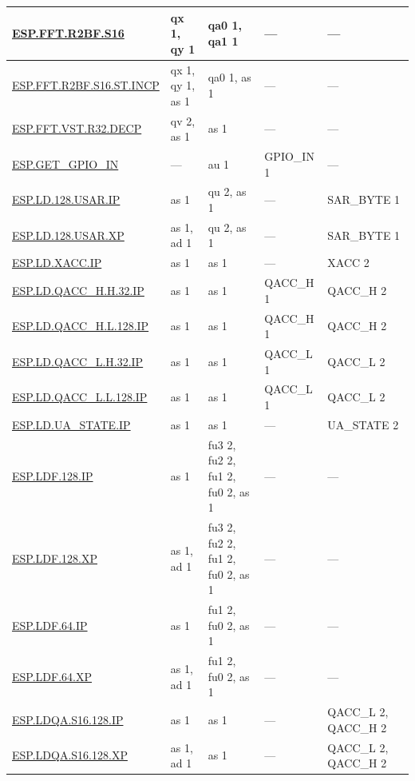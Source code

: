 \begin{longtable}[c]{|l|m{2.5cm}|m{2.5cm}|m{2.5cm}|m{2.5cm}|}
    \hyperref[instruction:ESPFFTR2BFS16]{ESP.FFT.R2BF.S16} & qx 1, qy 1 & qa0 1, qa1 1 & — & — \\\hline
    \hyperref[instruction:ESPFFTR2BFS16STINCP]{ESP.FFT.R2BF.S16.ST.INCP} & qx 1, qy 1, as 1 & qa0 1, as 1 & — & — \\\hline
    \hyperref[instruction:ESPFFTVSTR32DECP]{ESP.FFT.VST.R32.DECP} & qv 2, as 1 & as 1 & — & — \\\hline
    \hyperref[instruction:ESPGETGPIOIN]{ESP.GET\_GPIO\_IN} & — & au 1 & GPIO\_IN 1 & — \\\hline
    \hyperref[instruction:ESPLD128USARIP]{ESP.LD.128.USAR.IP} & as 1 & qu 2, as 1 & — & SAR\_BYTE 1\\\hline
    \hyperref[instruction:ESPLD128USARXP]{ESP.LD.128.USAR.XP} & as 1, ad 1 & qu 2, as 1 & — & SAR\_BYTE 1\\\hline
    \hyperref[instruction:ESPLDXACCIP]{ESP.LD.XACC.IP} & as 1 & as 1 & — & XACC 2\\\hline
    \hyperref[instruction:ESPLDQACCHH32IP]{ESP.LD.QACC\_H.H.32.IP} & as 1 & as 1 & QACC\_H 1 & QACC\_H 2\\\hline
    \hyperref[instruction:ESPLDQACCHL128IP]{ESP.LD.QACC\_H.L.128.IP} & as 1 & as 1 & QACC\_H 1 & QACC\_H 2\\\hline
    \hyperref[instruction:ESPLDQACCLH32IP]{ESP.LD.QACC\_L.H.32.IP} & as 1 & as 1 & QACC\_L 1 & QACC\_L 2\\\hline
    \hyperref[instruction:ESPLDQACCLL128IP]{ESP.LD.QACC\_L.L.128.IP} & as 1 & as 1 & QACC\_L 1 & QACC\_L 2\\\hline
    \hyperref[instruction:ESPLDUASTATEIP]{ESP.LD.UA\_STATE.IP} & as 1 & as 1 & — & UA\_STATE 2\\\hline
    \hyperref[instruction:ESPLDF128IP]{ESP.LDF.128.IP} & as 1 & fu3 2, fu2 2, fu1 2, fu0 2, as 1 & — & — \\\hline
    \hyperref[instruction:ESPLDF128XP]{ESP.LDF.128.XP} & as 1, ad 1 & fu3 2, fu2 2, fu1 2, fu0 2, as 1 & — & — \\\hline
    \hyperref[instruction:ESPLDF64IP]{ESP.LDF.64.IP} & as 1 & fu1 2, fu0 2, as 1 & — & — \\\hline
    \hyperref[instruction:ESPLDF64XP]{ESP.LDF.64.XP} & as 1, ad 1 & fu1 2, fu0 2, as 1 & — & — \\\hline
    \hyperref[instruction:ESPLDQAS16128IP]{ESP.LDQA.S16.128.IP} & as 1 & as 1 & — & QACC\_L 2, QACC\_H 2\\\hline
    \hyperref[instruction:ESPLDQAS16128XP]{ESP.LDQA.S16.128.XP} & as 1, ad 1 & as 1 & — & QACC\_L 2, QACC\_H 2\\\hline

\end{longtable}
